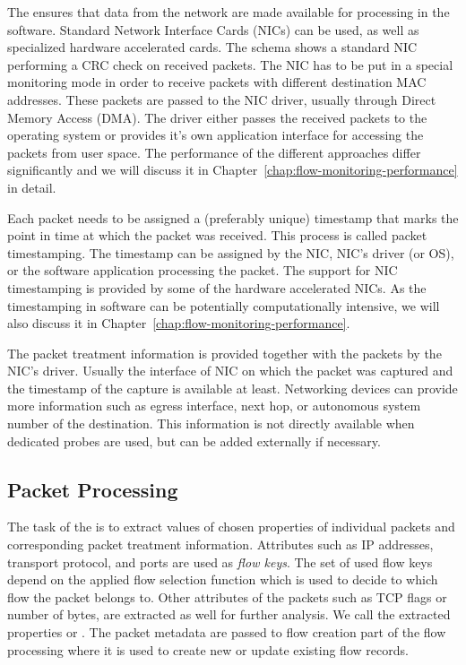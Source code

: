 The  ensures that data from the network are made available for processing in the software. Standard Network Interface Cards (NICs) can be used, as well as specialized hardware accelerated cards. The schema shows a standard NIC performing a CRC check on received packets. The NIC has to be put in a special monitoring mode in order to receive packets with different destination MAC addresses. These packets are passed to the NIC driver, usually through Direct Memory Access (DMA). The driver either passes the received packets to the operating system or provides it's own application interface for accessing the packets from user space. The performance of the different approaches differ significantly and we will discuss it in Chapter~\ref{chap:flow-monitoring-performance} in detail.

Each packet needs to be assigned a (preferably unique) timestamp that marks the point in time at which the packet was received. This process is called packet timestamping. The timestamp can be assigned by the NIC, NIC's driver (or OS), or the software application processing the packet. The support for NIC timestamping is provided by some of the hardware accelerated NICs. As the timestamping in software can be potentially computationally intensive, we will also discuss it in Chapter~\ref{chap:flow-monitoring-performance}.

The packet treatment information is provided together with the packets by the NIC's driver. Usually the interface of NIC on which the packet was captured and the timestamp of the capture is available at least. Networking devices can provide more information such as egress interface, next hop, or autonomous system number of the destination. This information is not directly available when dedicated probes are used, but can be added externally if necessary.

\subsection{Packet Processing}\label{subsec:packet-processing}

The task of the  is to extract values of chosen properties of individual packets and corresponding packet treatment information. Attributes such as IP addresses, transport protocol, and ports are used as \emph{flow keys}. The set of used flow keys depend on the applied flow selection function which is used to decide to which flow the packet belongs to. Other attributes of the packets such as TCP flags or number of bytes, are extracted as well for further analysis. We call the extracted properties \emph{} or \emph{}. The packet metadata are passed to flow creation part of the flow processing where it is used to create new or update existing flow records.

